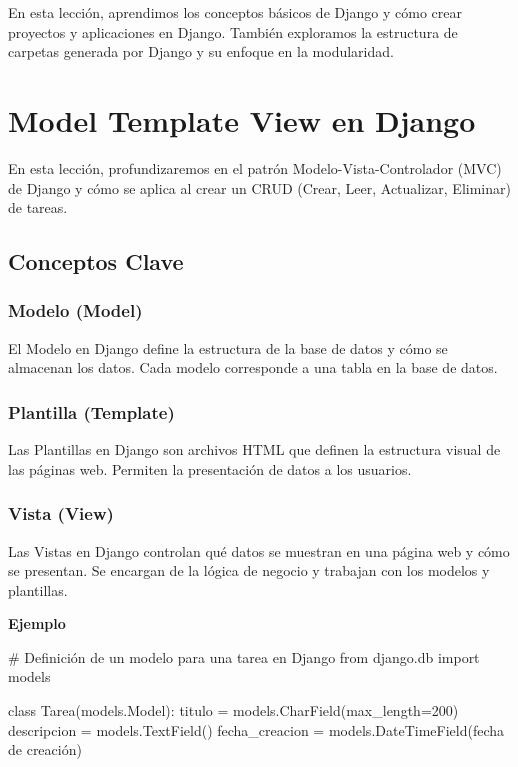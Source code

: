 \documentclass[
  a4paper,
  DIV=11,
  numbers=noendperiod,
  onepage,
  openany]{scrreprt}
\newenvironment{Shaded}{\begin{snugshade}}{\end{snugshade}}
\newcommand{\CommentTok}[1]{\textcolor[rgb]{0.37,0.37,0.37}{#1}}
\newcommand{\DecValTok}[1]{\textcolor[rgb]{0.68,0.00,0.00}{#1}}
\newcommand{\ImportTok}[1]{\textcolor[rgb]{0.00,0.46,0.62}{#1}}
\newcommand{\KeywordTok}[1]{\textcolor[rgb]{0.00,0.23,0.31}{#1}}
\newcommand{\NormalTok}[1]{\textcolor[rgb]{0.00,0.23,0.31}{#1}}
\newcommand{\OperatorTok}[1]{\textcolor[rgb]{0.37,0.37,0.37}{#1}}
\newcommand{\StringTok}[1]{\textcolor[rgb]{0.13,0.47,0.30}{#1}}
\begin{document}
En esta lección, aprendimos los conceptos básicos de Django y cómo crear
proyectos y aplicaciones en Django. También exploramos la estructura de
carpetas generada por Django y su enfoque en la modularidad.

\chapter{Model Template View en
Django}\label{model-template-view-en-django}

En esta lección, profundizaremos en el patrón Modelo-Vista-Controlador
(MVC) de Django y cómo se aplica al crear un CRUD (Crear, Leer,
Actualizar, Eliminar) de tareas.

\section{Conceptos Clave}\label{conceptos-clave-28}

\subsection{Modelo (Model)}\label{modelo-model}

El Modelo en Django define la estructura de la base de datos y cómo se
almacenan los datos. Cada modelo corresponde a una tabla en la base de
datos.

\subsection{Plantilla (Template)}\label{plantilla-template}

Las Plantillas en Django son archivos HTML que definen la estructura
visual de las páginas web. Permiten la presentación de datos a los
usuarios.

\subsection{Vista (View)}\label{vista-view}

Las Vistas en Django controlan qué datos se muestran en una página web y
cómo se presentan. Se encargan de la lógica de negocio y trabajan con
los modelos y plantillas.

\textbf{Ejemplo}

\begin{Shaded}
\begin{Highlighting}[]
\CommentTok{\# Definición de un modelo para una tarea en Django}
\ImportTok{from}\NormalTok{ django.db }\ImportTok{import}\NormalTok{ models}

\KeywordTok{class}\NormalTok{ Tarea(models.Model):}
\NormalTok{    titulo }\OperatorTok{=}\NormalTok{ models.CharField(max\_length}\OperatorTok{=}\DecValTok{200}\NormalTok{)}
\NormalTok{    descripcion }\OperatorTok{=}\NormalTok{ models.TextField()}
\NormalTok{    fecha\_creacion }\OperatorTok{=}\NormalTok{ models.DateTimeField(}\StringTok{\textquotesingle{}fecha de creación\textquotesingle{}}\NormalTok{)}
\end{Highlighting}
\end{Shaded}
\end{document}
